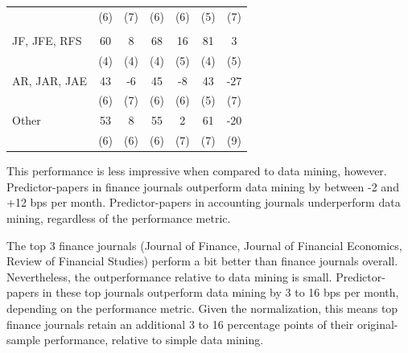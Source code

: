 \begin{table}[!h]
\begin{center}
\begin{tabular}{lcccccc}
                   & (6) & (7) & (6) & (6) & (5) & (7) \\
      \addlinespace
      \multicolumn{7}{l}{\textbf{Journal Rank}} \\
      JF, JFE, RFS & 60 & 8 & 68 & 16 & 81 & 3 \\
                   & (4) & (4) & (4) & (5) & (4) & (5) \\
      AR, JAR, JAE & 43 & -6 & 45 & -8 & 43 & -27 \\
                   & (6) & (7) & (6) & (6) & (5) & (7) \\
      Other        & 53 & 8 & 55 & 2 & 61 & -20 \\
                   & (6) & (6) & (6) & (7) & (7) & (9) \\
      \bottomrule
   \end{tabular}
   \end{center} 
\end{table}

This performance is less impressive when compared to data mining, however. Predictor-papers in finance journals outperform data mining by between -2 and +12 bps per month.  Predictor-papers in accounting journals underperform data mining, regardless of the performance metric.

The top 3 finance journals (Journal of Finance, Journal of Financial Economics, Review of Financial Studies) perform a bit better than finance journals overall. Nevertheless, the outperformance relative to data mining is small. Predictor-papers in these top journals outperform data mining by 3 to 16 bps per month, depending on the performance metric. Given the normalization, this means top finance journals retain an additional 3 to 16 percentage points of their original-sample performance, relative to simple data mining. 